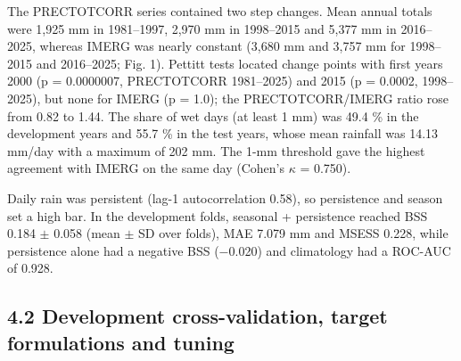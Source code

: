 \documentclass[
]{article}
\begin{document}
The PRECTOTCORR series contained two step changes. Mean annual totals were 1,925 mm in 1981--1997, 2,970 mm in 1998--2015 and 5,377 mm in 2016--2025, whereas IMERG was nearly constant (3,680 mm and 3,757 mm for 1998--2015 and 2016--2025; Fig. 1).  %
Pettitt tests \citep{pettitt1979} located change points with first years 2000 (p = 0.0000007, PRECTOTCORR 1981--2025) and 2015 (p = 0.0002, 1998--2025), but none for IMERG (p = 1.0); the PRECTOTCORR/IMERG ratio rose from 0.82 to 1.44.  %
The share of wet days (at least 1 mm) was 49.4 \% in the development years and 55.7 \% in the test years, whose mean rainfall was 14.13 mm/day with a maximum of 202 mm.  %
The 1-mm threshold gave the highest agreement with IMERG on the same day (Cohen's $\kappa$ = 0.750).  %

Daily rain was persistent (lag-1 autocorrelation 0.58), so persistence and season set a high bar.  %
In the development folds, seasonal + persistence reached BSS 0.184 $\pm$ 0.058 (mean $\pm$ SD over folds), MAE 7.079 mm and MSESS 0.228, while persistence alone had a negative BSS ($-$0.020) and climatology had a ROC-AUC of 0.928.  %

\hypertarget{development-cross-validation-target-formulations-and-tuning}{%
\subsection{4.2 Development cross-validation, target formulations and tuning}\label{development-cross-validation-target-formulations-and-tuning}}
\end{document}
